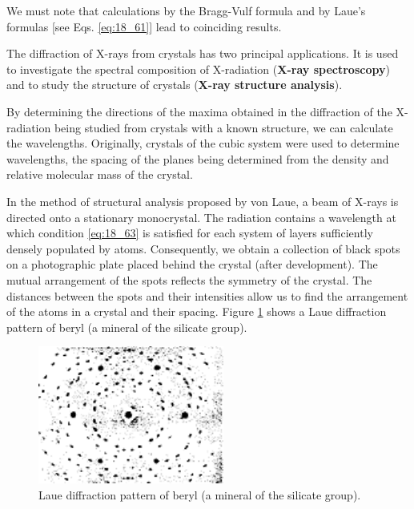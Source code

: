 We must note that calculations by the Bragg-Vulf formula and by Laue's formulas [see Eqs. \eqref{eq:18_61}] lead to coinciding results.

The diffraction of X-rays from crystals has two principal applications.
It is used to investigate the spectral composition of X-radiation (\textbf{X-ray spectroscopy}) and to study the structure of crystals (\textbf{X-ray structure analysis}).

By determining the directions of the maxima obtained in the diffraction of the X-radiation being studied from crystals with a known structure, we can calculate the wavelengths.
Originally, crystals of the cubic system were used to determine wavelengths, the spacing of the
planes being determined from the density and relative molecular mass of the crystal.

In the method of structural analysis proposed by von Laue, a beam of X-rays is directed onto
a stationary monocrystal.
The radiation contains a wavelength at which condition \eqref{eq:18_63} is satisfied for each system of layers sufficiently densely populated by atoms.
Consequently, we obtain a collection of black spots on a photographic plate placed behind the crystal (after development).
The mutual arrangement of the spots reflects the symmetry of the crystal.
The distances between the spots and their intensities allow us to find the arrangement of the atoms in a crystal and their spacing.
Figure \ref{fig:18_44} shows a Laue diffraction pattern of beryl (a mineral of the silicate group).

\begin{figure}[!htb]
	\begin{center}
		\includegraphics[scale=1.0]{figures/ch_18/fig_18_44.pdf}
        \caption[]{Laue diffraction pattern of beryl (a mineral of the silicate group).}
		\label{fig:18_44}
	\end{center}
	\vspace{-0.8cm}
\end{figure}


